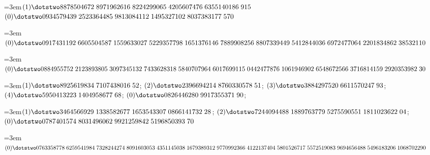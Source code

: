 %
\begingroup\raggedright
\par\noindent\hangindent=3em\enspace $(1)\dotstwo8878504672\;\allowbreak 8971962616\;\allowbreak 8224299065\;\allowbreak 4205607476\;\allowbreak 6355140186\;\allowbreak 915$ $(0)\dotstwo0934579439\;\allowbreak 2523364485\;\allowbreak 9813084112\;\allowbreak 1495327102\;\allowbreak 8037383177\;\allowbreak 570$\par\smallskip

\par\noindent\hangindent=3em\enspace $(0)\dotstwo0917431192\;\allowbreak 6605504587\;\allowbreak 1559633027\;\allowbreak 5229357798\;\allowbreak 1651376146\;\allowbreak 7889908256\;\allowbreak 8807339449\;\allowbreak 5412844036\;\allowbreak 6972477064\;\allowbreak 2201834862\;\allowbreak 38532110$\par\smallskip

\par\noindent\hangindent=3em\enspace $(0)\dotstwo0884955752\;\allowbreak 2123893805\;\allowbreak 3097345132\;\allowbreak 7433628318\;\allowbreak 5840707964\;\allowbreak 6017699115\;\allowbreak 0442477876\;\allowbreak 1061946902\;\allowbreak 6548672566\;\allowbreak 3716814159\;\allowbreak 2920353982\;\allowbreak 30$\par\smallskip

\par\noindent\hangindent=3em\enspace $(1)\dotstwo8925619834\;\allowbreak 7107438016\;\allowbreak 52$; $(2)\dotstwo2396694214\;\allowbreak 8760330578\;\allowbreak 51$; $(3)\dotstwo3884297520\;\allowbreak 6611570247\;\allowbreak 93$; $(4)\dotstwo5950413223\;\allowbreak 1404958677\;\allowbreak 68$; $(0)\dotstwo0826446280\;\allowbreak 9917355371\;\allowbreak 90$;\par\smallskip

\par\noindent\hangindent=3em\enspace $(1)\dotstwo3464566929\;\allowbreak 1338582677\;\allowbreak 1653543307\;\allowbreak 0866141732\;\allowbreak 28$; $(2)\dotstwo7244094488\;\allowbreak 1889763779\;\allowbreak 5275590551\;\allowbreak 1811023622\;\allowbreak 04$; $(0)\dotstwo0787401574\;\allowbreak 8031496062\;\allowbreak 9921259842\;\allowbreak 5196850393\;\allowbreak 70$\par\smallskip

\par\noindent\hangindent=3em\enspace $(0)\dotstwo0763358778\;\allowbreak 6259541984\;\allowbreak 7328244274\;\allowbreak 8091603053\;\allowbreak 4351145038\;\allowbreak 1679389312\;\allowbreak 9770992366\;\allowbreak 4122137404\;\allowbreak 5801526717\;\allowbreak 5572519083\;\allowbreak 9694656488\;\allowbreak 5496183206\;\allowbreak 1068702290$\par\smallskip

